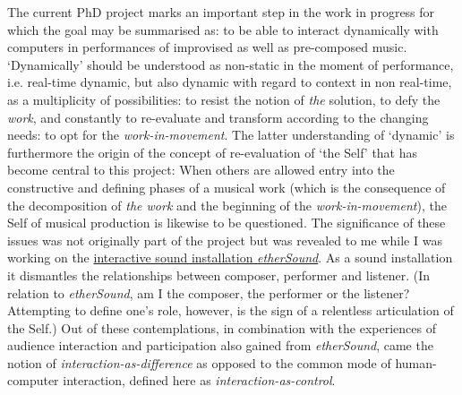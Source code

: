 The current PhD project marks an important step in the work in progress for which the goal may be summarised as: to be able to interact dynamically with computers in performances of improvised as well as pre-composed music. `Dynamically' should be understood as non-static in the moment of performance, i.e. real-time dynamic, but also dynamic with regard to context in non real-time, as a multiplicity of possibilities: to resist the notion of \emph{the} solution, to defy the \emph{work}, and constantly to re-evaluate and transform according to the changing needs: to opt for the \emph{work-in-movement}. The latter understanding of `dynamic' is furthermore the origin of the concept of re-evaluation of `the Self' that has become central to this project: When 
others are allowed entry into the constructive and defining phases of a musical work (which is the consequence of the decomposition of \emph{the work} and the beginning of the \emph{work-in-movement}), the Self of musical production is likewise to be questioned. The significance of these issues was not originally part of the project but was revealed to me while I was working on the \hyperref[sec:ethersound]{interactive sound installation \emph{etherSound}}. As a sound installation it dismantles the relationships between composer, performer and listener. (In relation to \emph{etherSound}, am I the composer, the performer or the listener? Attempting to define one's role, however, is the sign of a relentless articulation of the Self.) Out of these contemplations, in combination with the experiences of audience interaction and participation also gained from \emph{etherSound}, came the notion of \emph{interaction-as-difference} as opposed to the common mode of human-computer interaction, defined here as \emph{interaction-as-control}. 

